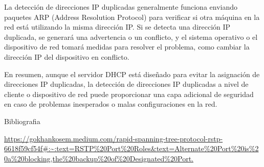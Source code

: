 \documentclass[a4paper]{article}
\begin{document}
\begin{enumerate}
La detección de direcciones IP duplicadas generalmente funciona enviando paquetes ARP (Address Resolution Protocol) para verificar si otra máquina en la red está utilizando la misma dirección IP. Si se detecta una dirección IP duplicada, se generará una advertencia o un conflicto, y el sistema operativo o el dispositivo de red tomará medidas para resolver el problema, como cambiar la dirección IP del dispositivo en conflicto.

En resumen, aunque el servidor DHCP está diseñado para evitar la asignación de direcciones IP duplicadas, la detección de direcciones IP duplicadas a nivel de cliente o dispositivo de red puede proporcionar una capa adicional de seguridad en caso de problemas inesperados o malas configuraciones en la red.
\end{enumerate}
Bibliografia

\url{https://gokhankosem.medium.com/rapid-spanning-tree-protocol-rstp-6618f59cf54f#:~:text=RSTP%20Port%20Roles&text=Alternate%20Port%20is%20a%20blocking,the%20backup%20of%20Designated%20Port.}
	
\end{document}
